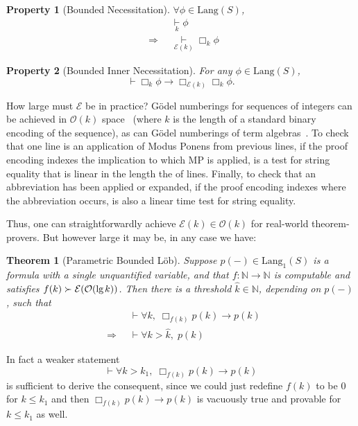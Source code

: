 \documentclass[onecolumn]{miri-tech-article}
\newtheorem{theorem}{Theorem}
\newtheorem{property}{Property}
\numberwithin{equation}{section}
\theoremstyle{definition}
\newcommand{\NN}{\mathbb{N}}
\newcommand{\Ee}{\mathcal{E}}
\newcommand{\Oo}{\mathcal{O}}
\newcommand{\proves}[1]{\underset{#1}{\vdash}}
\newcommand{\bx}[1]{\Box_{#1}}
\newcommand{\Lang}{\mathrm{Lang}}
\renewcommand{\implies}{\rightarrow}
\renewcommand{\to}{\rightarrow}
\newcommand{\Implies}{\;\;\Rightarrow\;\;}
\renewcommand{\lg}{\mathrm{lg\hspace{0.3ex}}}
\renewcommand{\-}{^{-1}}
\begin{document}
\begin{property}[Bounded Necessitation]
$\forall \phi \in \Lang(S)$,
\begin{align}
             &\proves{k} \phi \\
\Implies &\proves{\Ee (k)} \bx{k} \phi
\end{align}
\end{property}
\begin{property}[Bounded Inner Necessitation]
For any $\phi \in \Lang(S)$,
$$\proves{} \bx{k}\phi \implies \bx{\Ee (k)}\bx{k}\phi.$$
\end{property}

\noindent {\bf Achieving $\Ee(k)\in \Oo(k)$.}  How large must $\Ee$ be in practice?  G\"{o}del numberings for sequences of integers can be achieved in $\Oo(k)$ space~\cite{Tsai:2002} (where $k$ is the length of a standard binary encoding of the sequence), as can G\"{o}del numberings of term algebras~\cite{Tarau:2013}.  To check that one line is an application of Modus Ponens from previous lines, if the proof encoding indexes the implication to which MP is applied, is a test for string equality that is linear in the length the of lines.  Finally, to check that an abbreviation has been applied or expanded, if the proof encoding indexes where the abbreviation occurs, is also a linear time test for string equality.  

Thus, one can straightforwardly achieve $\Ee(k) \in \Oo(k)$ for real-world theorem-provers.  But however large it may be, in any case we have:

\begin{theorem}[Parametric Bounded L\"{o}b]\label{thm:pblob}
Suppose $p(-)\in\Lang_1(S)$ is a formula with a single unquantified variable, and that $f:\NN \to \NN$ is computable and satisfies $f(k) \succ \Ee(\Oo(\lg k))$.  Then there is a threshold $\hat k \in \NN$, depending on $p(-)$, such that
\begin{align*}
             &\proves{} \forall k,\; \bx{f(k)}p(k) \implies p(k)\\
\Implies &\proves{} \forall k>\hat k, \; p(k)
\end{align*}
\end{theorem}

 In fact a weaker statement
$$\proves{} \forall k>k_1,\; \bx{f(k)}p(k) \implies p(k)$$
is sufficient to derive the consequent, since we could just redefine $f(k)$ to be $0$ for $k\leq k_1$ and then $\bx{f(k)}p(k) \implies p(k)$ is vacuously true and provable for $k \leq k_1$ as well.
\end{document}
